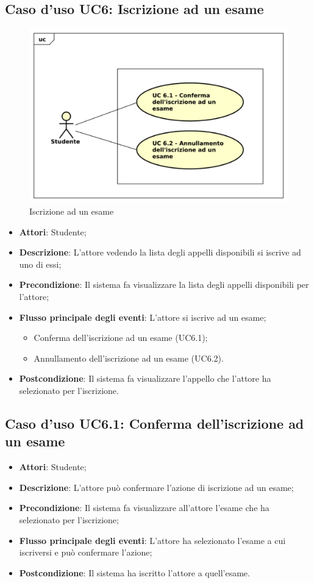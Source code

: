 \subsection{Caso d'uso \texorpdfstring{UC6}{UC6}: Iscrizione ad un esame}
\begin{figure} [H]
	\centering
	\includegraphics[scale=0.45]{./img/UC6.pdf}
	\caption{Iscrizione ad un esame}\label{}
\end{figure}
\begin{itemize}
	\item \textbf{Attori}: Studente;
	\item \textbf{Descrizione}: L'attore vedendo la lista degli appelli disponibili si iscrive ad uno di essi;
	\item \textbf{Precondizione}: Il sistema fa visualizzare la lista degli appelli disponibili per l'attore;
	\item \textbf{Flusso principale degli eventi}: L'attore si iscrive ad un esame;
	\begin{itemize}
		\item Conferma dell'iscrizione ad un esame (UC6.1);
		\item Annullamento dell'iscrizione ad un esame (UC6.2).
	\end{itemize}
	\item \textbf{Postcondizione}: Il sistema fa visualizzare l'appello che l'attore ha selezionato per l'iscrizione.
\end{itemize}
\subsection{Caso d'uso \texorpdfstring{UC6.1}{UC6.1}: Conferma dell'iscrizione ad un esame}
\begin{itemize}
	\item \textbf{Attori}: Studente;
	\item \textbf{Descrizione}: L'attore può confermare l'azione di iscrizione ad un esame;
	\item \textbf{Precondizione}: Il sistema fa visualizzare all'attore l'esame che ha selezionato per l'iscrizione;
	\item \textbf{Flusso principale degli eventi}: L'attore ha selezionato l'esame a cui iscriversi e può confermare l'azione;
	\item \textbf{Postcondizione}: Il sistema ha iscritto l'attore a quell'esame.
\end{itemize}

